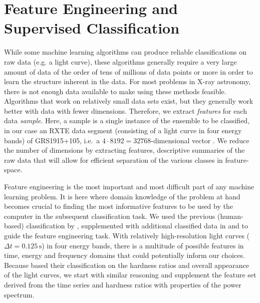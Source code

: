 \documentclass[12pt]{emulateapj}
\begin{document}
\section{Feature Engineering and Supervised Classification}

While some machine learning algorithms can produce reliable classifications on raw data (e.g. a light curve), these algorithms generally require a very large amount of data of the order of tens of millions of data points or more in order to learn the structure inherent in the data. 
For most problems in X-ray astronomy, there is not enough data available to make using these methods feasible. Algorithms that work on relatively small data sets exist, but they generally work better with data with fewer dimensions. Therefore, we extract \textit{features} for each data \textit{sample}. 
Here, a sample is a single instance of the ensemble to be classified, in our case an RXTE data segment (consisting of a light curve in four energy bands) of GRS1915+105, i.e.\ a $4 \cdot 8192 = 32768$-dimensional vector . We reduce the number of dimensions by extracting features, descriptive summaries of the raw data that will allow for efficient separation of the various classes in feature-space. 

Feature engineering is the most important and most difficult part of any machine learning problem. It is here where domain knowledge of the problem at hand becomes crucial to finding the most informative features to be used by the computer in the subsequent classification task. 
We used the previous (human-based) classification by \citet{belloni2000}, supplemented with additional classified data in \citet{kleinwolt2002} and \citet{hannikainen2003} to guide the feature engineering task. With relatively high-resolution light curves ($\Delta t = 0.125 \,\mathrm{s}$) in four energy bands, there is a multitude of possible features in time, energy and frequency domains that could potentially inform our choices. Because \citet{belloni2000} based their classification on the hardness ratios and overall appearance of the light curves, we start with similar reasoning and supplement the feature set derived from the time series and hardness ratios with properties of the power spectrum. 

\end{document}
